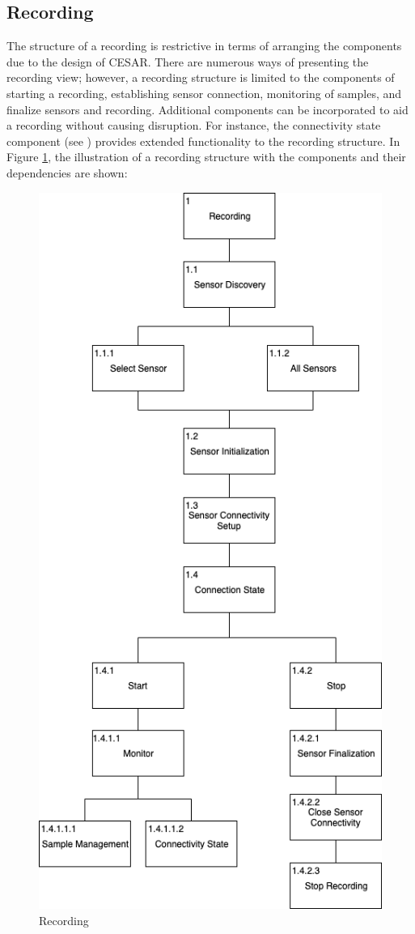 
\subsection{Recording}
The structure of a recording is restrictive in terms of arranging the components due to the design of CESAR. There are numerous ways of presenting the recording view; however, a recording structure is limited to the components of starting a recording, establishing sensor connection, monitoring of samples, and finalize sensors and recording. Additional components can be incorporated to aid a recording without causing disruption. For instance, the connectivity state component (see ) provides extended functionality to the recording structure. In Figure \ref{fig:hta_recording}, the illustration of a recording structure with the components and their dependencies are shown:

\begin{figure}
    \centering
    \includegraphics[scale=0.5]{images/Recording.png}
    \caption{Recording}
    \label{fig:hta_recording}
\end{figure}


